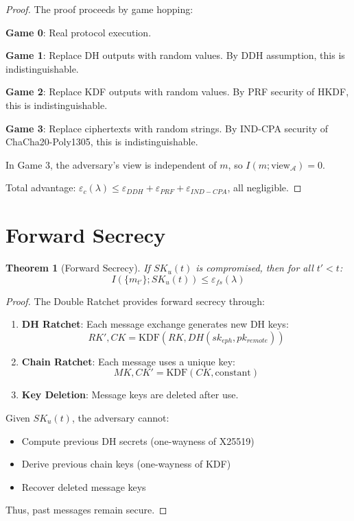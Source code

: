 \documentclass[11pt,a4paper]{article}
\newtheorem{theorem}{Theorem}[section]
\begin{document}
\begin{proof}
The proof proceeds by game hopping:

\textbf{Game 0}: Real protocol execution.

\textbf{Game 1}: Replace DH outputs with random values. By DDH assumption, this is indistinguishable.

\textbf{Game 2}: Replace KDF outputs with random values. By PRF security of HKDF, this is indistinguishable.

\textbf{Game 3}: Replace ciphertexts with random strings. By IND-CPA security of ChaCha20-Poly1305, this is indistinguishable.

In Game 3, the adversary's view is independent of $m$, so $I(m; \text{view}_{\mathcal{A}}) = 0$.

Total advantage: $\varepsilon_c(\lambda) \leq \varepsilon_{DDH} + \varepsilon_{PRF} + \varepsilon_{IND-CPA}$, all negligible.
\end{proof}

\section{Forward Secrecy}

\begin{theorem}[Forward Secrecy]
If $SK_u(t)$ is compromised, then for all $t' < t$:
$$I(\{m_{t'}\}; SK_u(t)) \leq \varepsilon_{fs}(\lambda)$$
\end{theorem}

\begin{proof}
The Double Ratchet provides forward secrecy through:

\begin{enumerate}
    \item \textbf{DH Ratchet}: Each message exchange generates new DH keys:
    $$RK', CK = \text{KDF}(RK, DH(sk_{eph}, pk_{remote}))$$
    
    \item \textbf{Chain Ratchet}: Each message uses a unique key:
    $$MK, CK' = \text{KDF}(CK, \text{constant})$$
    
    \item \textbf{Key Deletion}: Message keys are deleted after use.
\end{enumerate}

Given $SK_u(t)$, the adversary cannot:
\begin{itemize}
    \item Compute previous DH secrets (one-wayness of X25519)
    \item Derive previous chain keys (one-wayness of KDF)
    \item Recover deleted message keys
\end{itemize}

Thus, past messages remain secure.
\end{proof}
\end{document}

